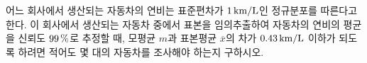어느 회사에서 생산되는 자동차의 연비는 표준편차가 $1\mkern3mu \mathrm{km/L}$인 정규분포를 따른다고 한다. 이 회사에서 생산되는 자동차 중에서 표본을 임의추출하여 자동차의 연비의 평균을 신뢰도 $99\mkern3mu \%$로 추정할 때, 모평균 $m$과 표본평균 $\overline{x}$의 차가 $0.43\mkern3mu \mathrm{km/L}$ 이하가 되도록 하려면 적어도 몇 대의 자동차를 조사해야 하는지 구하시오. 
